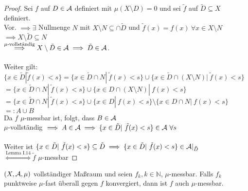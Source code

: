   \begin{proof}
    Sei $f$ auf $D \in \mathcal{A}$ definiert mit $\mu(X \setminus D) = 0$ und sei $\tilde{f}$ auf $\tilde{D} \subseteq X$ definiert.\\
    Vor. $\implies \exists$ Nullmenge $N$ mit $X \setminus N \subseteq \cap \tilde{D}$ und $\tilde{f}(x) = f(x) \ \forall x \in X \setminus N$\\
    $\implies X \setminus \tilde{D} \subseteq N$\\
    $\stackrel{\mu\text{-vollständig}}{\implies} X\setminus \tilde{D} \in \mathcal{A} \implies \tilde{D} \in \mathcal{A}$.\\ \\
    Weiter gilt: \\
    $\{x \in \tilde{D}| \tilde{f}(x) < s\} = \{x \in \tilde{D} \cap N |\ \tilde{f}(x) < s\} \cup \{x \in \tilde{D} \cap (X \setminus N)|\ \tilde{f}(x) < s\}$\\
    $ = \{x \in \tilde{D} \cap N |\ \tilde{f}(x) < s\} \cup \{x \in D \cap (X \setminus N) |\ f(x) < s\}$\\
    $ = \{x \in \tilde{D} \cap N |\ \tilde{f}(x) < s\} \cup \{x \in D|\ f(x) < s\} \setminus \{x \in D \cap N |\ f(x) < s\}$\\
    $=: A \cup B$\\
    Da $f$ $\mu$-messbar ist, folgt, dass $B \in \mathcal{A}$\\
    $\mu$-vollständig $\implies A \in \mathcal{A} \implies \{x \in \tilde{D} |\ \tilde{f}(x) < s\} \in \mathcal{A} \ \forall s$\\ \\
    Weiter ist $\{x \in \tilde{D}|\ \tilde{f}(x) < s\} \subseteq \tilde{D} \implies \{x \in \tilde{D}|\ \tilde{f}(x) < s\} \in \mathcal{A}|_{\tilde{D}}$\\
    $\stackrel{\text{Lemma I.14}}{\Leftrightarrow} \tilde{f}$ $\mu$-messbar
  \end{proof}

  \begin{theorem}
    $(X, \mathcal{A}, \mu)$ vollständiger Maßraum und seien $f_k, k \in \mathbb{N}$, $\mu$-messbar. Falls $f_k$ punktweise $\mu$-fast überall gegen $f$ konvergiert, dann ist $f$ auch $\mu$-messbar.
  \end{theorem}

